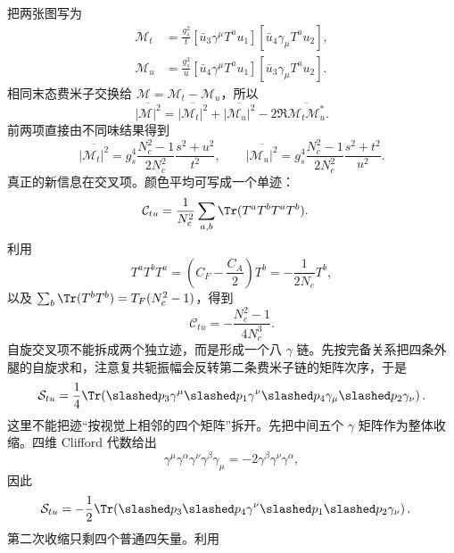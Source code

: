 \begin{derivation}[相同夸克散射的交换干涉]
把两张图写为
\begin{align*}
\mathcal M_t&=\frac{g_s^2}{t}
[\bar u_3\gamma^\mu T^a u_1]
[\bar u_4\gamma_\mu T^a u_2],\\
\mathcal M_u&=\frac{g_s^2}{u}
[\bar u_4\gamma^\mu T^a u_1]
[\bar u_3\gamma_\mu T^a u_2].
\end{align*}
相同末态费米子交换给 $\mathcal M=\mathcal M_t-\mathcal M_u$，所以
\begin{equation*}
\overline{|\mathcal M|^2}
=\overline{|\mathcal M_t|^2}
+\overline{|\mathcal M_u|^2}
-2\Re\overline{\mathcal M_t\mathcal M_u^*}.
\end{equation*}
前两项直接由不同味结果得到
\begin{equation*}
\overline{|\mathcal M_t|^2}
=g_s^4\frac{N_c^2-1}{2N_c^2}\frac{s^2+u^2}{t^2},
\qquad
\overline{|\mathcal M_u|^2}
=g_s^4\frac{N_c^2-1}{2N_c^2}\frac{s^2+t^2}{u^2}.
\end{equation*}
真正的新信息在交叉项。颜色平均可写成一个单迹：
\begin{align*}
\mathcal C_{tu}
&=\frac1{N_c^2}\sum_{a,b}\Tr(T^aT^bT^aT^b).
\end{align*}
利用
\begin{equation*}
T^aT^bT^a=\left(C_F-\frac{C_A}{2}\right)T^b
=-\frac{1}{2N_c}T^b,
\end{equation*}
以及 $\sum_b\Tr(T^bT^b)=T_F(N_c^2-1)$，得到
\begin{equation*}
\mathcal C_{tu}
=-\frac{N_c^2-1}{4N_c^3}.
\end{equation*}
自旋交叉项不能拆成两个独立迹，而是形成一个八 $\gamma$ 链。先按完备关系把四条外腿的自旋求和，注意复共轭振幅会反转第二条费米子链的矩阵次序，于是
\begin{equation*}
\mathcal S_{tu}
=\frac14\Tr\!\left(
\slashed p_3\gamma^\mu\slashed p_1\gamma^\nu
\slashed p_4\gamma_\mu\slashed p_2\gamma_\nu
\right).
\end{equation*}
这里不能把迹“按视觉上相邻的四个矩阵”拆开。先把中间五个 $\gamma$ 矩阵作为整体收缩。四维 Clifford 代数给出
\begin{equation*}
\gamma^\mu\gamma^\alpha\gamma^\nu\gamma^\beta\gamma_\mu
=-2\gamma^\beta\gamma^\nu\gamma^\alpha,
\end{equation*}
因此
\begin{align*}
\mathcal S_{tu}
&=-\frac12\Tr\!\left(
\slashed p_3\slashed p_4\gamma^\nu
\slashed p_1\slashed p_2\gamma_\nu
\right).
\end{align*}
第二次收缩只剩四个普通四矢量。利用

\end{derivation}
